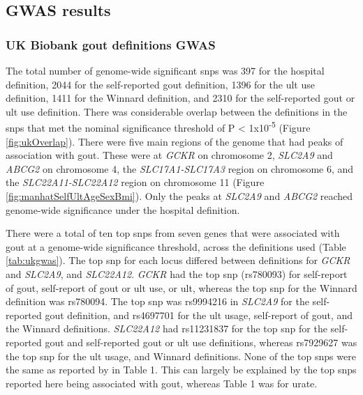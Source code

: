 \documentclass[twoside,openright]{report}
\begin{document}
\subsection{GWAS results}\label{gwasResults}

\subsubsection{UK Biobank gout definitions
GWAS}\label{uk-biobank-gout-definitions-gwas}

The total number of genome-wide significant \glspl{snp} was 397 for the
hospital definition, 2044 for the self-reported gout definition, 1396
for the \gls{ult} use definition, 1411 for the Winnard definition, and
2310 for the self-reported gout or \gls{ult} use definition. There was
considerable overlap between the definitions in the \glspl{snp} that met
the nominal significance threshold of P \textless{}
1x10\textsuperscript{-5} (Figure \ref{fig:ukOverlap}). There were five
main regions of the genome that had peaks of association with gout.
These were at \emph{GCKR} on chromosome 2, \emph{SLC2A9} and
\emph{ABCG2} on chromosome 4, the \emph{SLC17A1-SLC17A3} region on
chromosome 6, and the \emph{SLC22A11-SLC22A12} region on chromosome 11
(Figure \ref{fig:manhatSelfUltAgeSexBmi}). Only the peaks at
\emph{SLC2A9} and \emph{ABCG2} reached genome-wide significance under
the hospital definition.

There were a total of ten top \glspl{snp} from seven genes that were
associated with gout at a genome-wide significance threshold, across the
definitions used (Table \ref{tab:ukgwas}). The top \gls{snp} for each
locus differed between definitions for \emph{GCKR} and \emph{SLC2A9},
and \emph{SLC22A12}. \emph{GCKR} had the top \gls{snp} (rs780093) for
self-report of gout, self-report of gout or \gls{ult} use, or \gls{ult},
whereas the top \gls{snp} for the Winnard definition was rs780094. The
top \gls{snp} was rs9994216 in \emph{SLC2A9} for the self-reported gout
definition, and rs4697701 for the \gls{ult} usage, self-report of gout,
and the Winnard definitions. \emph{SLC22A12} had rs11231837 for the top
\gls{snp} for the self-reported gout and self-reported gout or \gls{ult}
use definitions, whereas rs7929627 was the top \gls{snp} for the
\gls{ult} usage, and Winnard definitions. None of the top \glspl{snp}
were the same as reported by \citet{Kottgen2013} in Table 1. This can
largely be explained by the top \glspl{snp} reported here being
associated with gout, whereas \citet{Kottgen2013} Table 1 was for urate.
\end{document}
